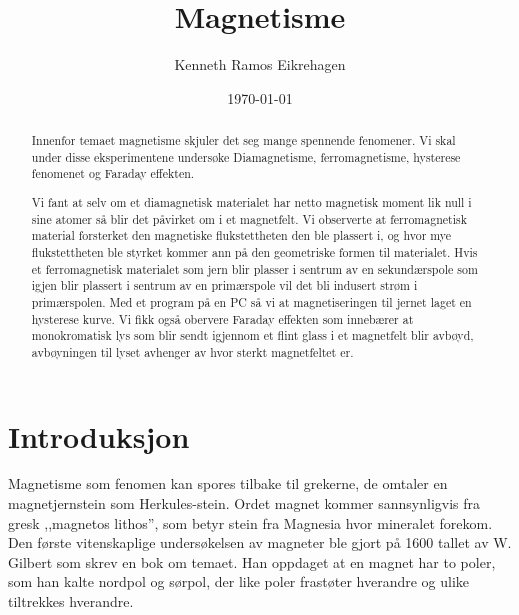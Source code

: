 \documentclass[norsk,a4paper,12pt]{article}
\title{Magnetisme}
\author{Kenneth Ramos Eikrehagen}
\date{\today}
\begin{document}
\renewcommand{\abstractname}{\large Sammendrag}
\renewcommand{\contentsname}{\LARGE Innhold}
\renewcommand{\listfigurename}{\Large Figur liste}
\renewcommand{\listtablename}{\Large Tabell liste}
\renewcommand\appendixpagename{Appendix}
\renewcommand\appendixtocname{Appendix}

\maketitle
\newpage
\tableofcontents
\listoffigures
\listoftables
\newpage





\begin{abstract}
Innenfor temaet magnetisme skjuler det seg mange spennende fenomener. Vi skal under disse eksperimentene undersøke Diamagnetisme, ferromagnetisme, hysterese fenomenet og Faraday effekten. 

Vi fant at selv om et diamagnetisk materialet har netto magnetisk moment lik null i sine atomer så blir det påvirket om i et magnetfelt. Vi observerte at ferromagnetisk material forsterket den magnetiske flukstettheten den ble plassert i, og hvor mye flukstettheten ble styrket kommer ann på den geometriske formen til materialet. Hvis et ferromagnetisk materialet som jern blir plasser i sentrum av en sekundærspole som igjen blir plassert i sentrum av en primærspole vil det bli indusert strøm i primærspolen. Med et program på en PC så vi at magnetiseringen til jernet laget en hysterese kurve. 
Vi fikk også obervere Faraday effekten som innebærer at monokromatisk lys som blir sendt igjennom et flint glass i et magnetfelt blir avbøyd, avbøyningen til lyset avhenger av hvor sterkt magnetfeltet er.
\end{abstract}



\section{Introduksjon}
Magnetisme som fenomen kan spores tilbake til grekerne, de omtaler en magnetjernstein som Herkules-stein. Ordet magnet kommer sannsynligvis fra gresk ,,magnetos lithos'', som betyr stein fra Magnesia hvor mineralet forekom. Den første vitenskaplige undersøkelsen av magneter ble gjort på 1600 tallet av W. Gilbert som skrev en bok om temaet. Han oppdaget at en magnet har to poler, som han kalte nordpol og sørpol, der like poler frastøter hverandre og ulike tiltrekkes hverandre.
\end{document}
